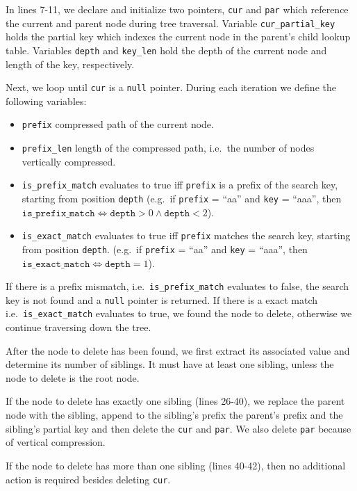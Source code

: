 \documentclass[abstracton,12pt]{scrartcl}
\theoremstyle{definition}
\begin{document}
In lines 7-11, we declare and initialize two pointers, \texttt{cur} and
\texttt{par} which reference the current and parent node during tree traversal.
Variable \texttt{cur\_partial\_key} holds the partial key which indexes the
current node in the parent's child lookup table.
Variables \texttt{depth} and \texttt{key\_len} hold the depth of the current
node and length of the key, respectively.

Next, we loop until \texttt{cur} is a \texttt{null} pointer. During each
iteration we define the following variables:
\begin{itemize}
  \item \texttt{prefix} compressed path of the current node.
  \item \texttt{prefix\_len} length of the compressed path, i.e.\ the number
    of nodes vertically compressed.
  \item \texttt{is\_prefix\_match} evaluates to true iff \texttt{prefix} is a
    prefix of the search key, starting from position \texttt{depth}
    (e.g.\ if \texttt{prefix} = ``aa'' and \texttt{key} = ``aaa'', then
    $\texttt{is\_prefix\_match} \iff \texttt{depth} > 0 \land \texttt{depth} < 2$).
  \item \texttt{is\_exact\_match} evaluates to true iff \texttt{prefix} matches
    the search key, starting from position \texttt{depth}.
    (e.g.\ if \texttt{prefix} = ``aa'' and \texttt{key} = ``aaa'', then
    $\texttt{is\_exact\_match} \iff \texttt{depth} = 1$).
\end{itemize}

If there is a prefix mismatch, i.e.\ \texttt{is\_prefix\_match} evaluates to
false, the search key is not found and a \texttt{null} pointer is returned.
If there is a exact match i.e.\ \texttt{is\_exact\_match} evaluates to true,
we found the node to delete, otherwise we continue traversing down the tree.

After the node to delete has been found, we first extract its associated value
and determine its number of siblings. It must have at least one sibling, 
unless the node to delete is the root node.

If the node to delete has exactly one sibling (lines 26-40), we replace the 
parent node with the sibling, append to the sibling's prefix the parent's
prefix and the sibling's partial key and then delete the \texttt{cur} and
\texttt{par}. We also delete \texttt{par} because of vertical compression.

If the node to delete has more than one sibling (lines 40-42), then no additional action
is required besides deleting \texttt{cur}.
\end{document}

